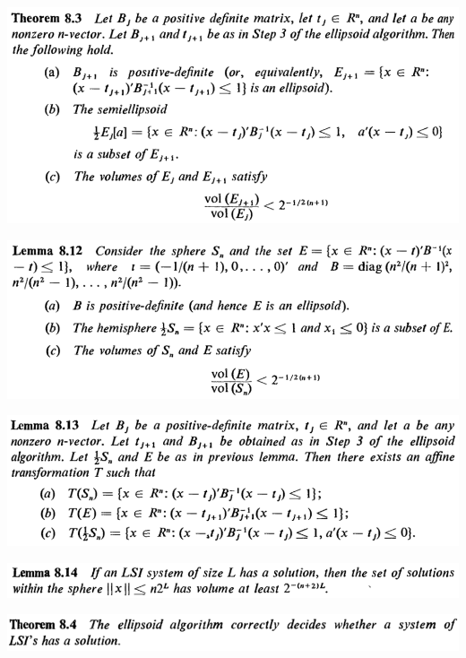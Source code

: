 \documentclass[11pt]{article}
\begin{document}
\begin{center}
\includegraphics[width=.9\linewidth]{The Ellipsoid Algorithm/screenshot_2019-03-10_13-11-42.png}
\end{center} 

\begin{center}
\includegraphics[width=.9\linewidth]{The Ellipsoid Algorithm/screenshot_2019-03-10_13-12-16.png}
\end{center} 

\begin{center}
\includegraphics[width=.9\linewidth]{The Ellipsoid Algorithm/screenshot_2019-03-10_13-15-07.png}
\end{center}

\begin{center}
\includegraphics[width=.9\linewidth]{The Ellipsoid Algorithm/screenshot_2019-03-10_13-34-58.png}
\end{center}

\begin{center}
\includegraphics[width=.9\linewidth]{The Ellipsoid Algorithm/screenshot_2019-03-10_13-33-53.png}
\end{center}
\end{document}
